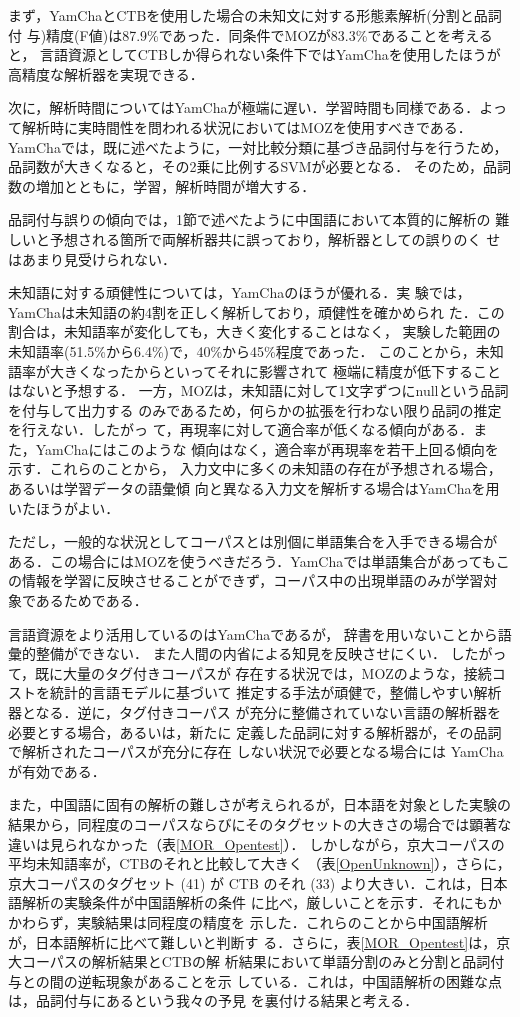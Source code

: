 まず，YamChaとCTBを使用した場合の未知文に対する形態素解析(分割と品詞付
与)精度(F値)は87.9\%であった．同条件でMOZが83.3\%であることを考えると，
言語資源としてCTBしか得られない条件下ではYamChaを使用したほうが
高精度な解析器を実現できる．

次に，解析時間についてはYamChaが極端に遅い．学習時間も同様である．よっ
て解析時に実時間性を問われる状況においてはMOZを使用すべきである．
YamChaでは，既に述べたように，一対比較分類に基づき品詞付与を行うため，
品詞数が大きくなると，その2乗に比例するSVMが必要となる．
そのため，品詞数の増加とともに，学習，解析時間が増大する．

品詞付与誤りの傾向では，1節で述べたように中国語において本質的に解析の
難しいと予想される箇所で両解析器共に誤っており，解析器としての誤りのく
せはあまり見受けられない．

未知語に対する頑健性については，YamChaのほうが優れる．実
験では，YamChaは未知語の約4割を正しく解析しており，頑健性を確かめられ
た．この割合は，未知語率が変化しても，大きく変化することはなく，
実験した範囲の未知語率(51.5\%から6.4\%)で，40\%から45\%程度であった．
このことから，未知語率が大きくなったからといってそれに影響されて
極端に精度が低下することはないと予想する．
一方，MOZは，未知語に対して1文字ずつにnullという品詞を付与して出力する
のみであるため，何らかの拡張を行わない限り品詞の推定を行えない．したがっ
て，再現率に対して適合率が低くなる傾向がある．また，YamChaにはこのような
傾向はなく，適合率が再現率を若干上回る傾向を示す．これらのことから，
入力文中に多くの未知語の存在が予想される場合，あるいは学習データの語彙傾
向と異なる入力文を解析する場合はYamChaを用いたほうがよい．

ただし，一般的な状況としてコーパスとは別個に単語集合を入手できる場合が
ある．この場合にはMOZを使うべきだろう．YamChaでは単語集合があってもこ
の情報を学習に反映させることができず，コーパス中の出現単語のみが学習対
象であるためである．

言語資源をより活用しているのはYamChaであるが，
辞書を用いないことから語彙的整備ができない．
また人間の内省による知見を反映させにくい．
したがって，既に大量のタグ付きコーパスが
存在する状況では，MOZのような，接続コストを統計的言語モデルに基づいて
推定する手法が頑健で，整備しやすい解析器となる．逆に，タグ付きコーパス
が充分に整備されていない言語の解析器を必要とする場合，あるいは，新たに
定義した品詞に対する解析器が，その品詞で解析されたコーパスが充分に存在
しない状況で必要となる場合には YamCha が有効である．

また，中国語に固有の解析の難しさが考えられるが，日本語を対象とした実験の
結果から，同程度のコーパスならびにそのタグセットの大きさの場合では顕著な
違いは見られなかった（表\ref{MOR_Opentest}）．
しかしながら，京大コーパスの平均未知語率が，CTBのそれと比較して大きく
（表\ref{OpenUnknown}），さらに，京大コーパスのタグセット (41) が CTB 
のそれ (33) より大きい．これは，日本語解析の実験条件が中国語解析の条件
に比べ，厳しいことを示す．それにもかかわらず，実験結果は同程度の精度を
示した．これらのことから中国語解析が，日本語解析に比べて難しいと判断す
る．さらに，表\ref{MOR_Opentest}は，京大コーパスの解析結果とCTBの解
析結果において単語分割のみと分割と品詞付与との間の逆転現象があることを示
している．これは，中国語解析の困難な点は，品詞付与にあるという我々の予見
を裏付ける結果と考える．

